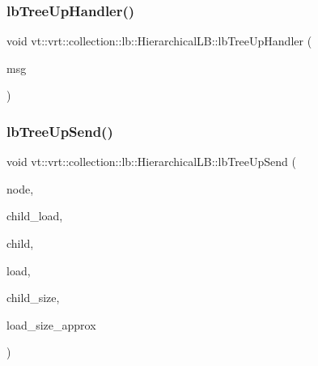 \mbox{\label{structvt_1_1vrt_1_1collection_1_1lb_1_1_hierarchical_l_b_a3b67d27c10a6a7532c9c5d1a57ab722a}} 
\subsubsection{\texorpdfstring{lb\+Tree\+Up\+Handler()}{lbTreeUpHandler()}}
{\footnotesize\ttfamily void vt\+::vrt\+::collection\+::lb\+::\+Hierarchical\+L\+B\+::lb\+Tree\+Up\+Handler (\begin{DoxyParamCaption}\item[{\hyperlink{structvt_1_1vrt_1_1collection_1_1lb_1_1_l_b_tree_up_msg}{L\+B\+Tree\+Up\+Msg} $\ast$}]{msg }\end{DoxyParamCaption})\hspace{0.3cm}{\ttfamily [private]}}

\mbox{\label{structvt_1_1vrt_1_1collection_1_1lb_1_1_hierarchical_l_b_a713887ab6f0cd72df36f05f756ae245d}} 
\subsubsection{\texorpdfstring{lb\+Tree\+Up\+Send()}{lbTreeUpSend()}}
{\footnotesize\ttfamily void vt\+::vrt\+::collection\+::lb\+::\+Hierarchical\+L\+B\+::lb\+Tree\+Up\+Send (\begin{DoxyParamCaption}\item[{\hyperlink{namespacevt_a866da9d0efc19c0a1ce79e9e492f47e2}{Node\+Type} const}]{node,  }\item[{\hyperlink{structvt_1_1vrt_1_1collection_1_1lb_1_1_base_l_b_a215e22b9f12678303f49615ae3be05cc}{Load\+Type} const}]{child\+\_\+load,  }\item[{\hyperlink{namespacevt_a866da9d0efc19c0a1ce79e9e492f47e2}{Node\+Type} const}]{child,  }\item[{\hyperlink{structvt_1_1vrt_1_1collection_1_1lb_1_1_base_l_b_a331d7da5bbf2883238427d86b54ddd7b}{Obj\+Sample\+Type} const \&}]{load,  }\item[{\hyperlink{namespacevt_a866da9d0efc19c0a1ce79e9e492f47e2}{Node\+Type} const}]{child\+\_\+size,  }\item[{std\+::size\+\_\+t const \&}]{load\+\_\+size\+\_\+approx }\end{DoxyParamCaption})\hspace{0.3cm}{\ttfamily [private]}}

